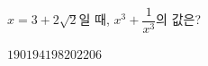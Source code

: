 $x=3+2\sqrt{2}$일 때, $x^3+\dfrac{1}{x^3}$의 값은?
\begin{choices32}{$190$}{$194$}{$198$}{$202$}{$206$}\end{choices32}
